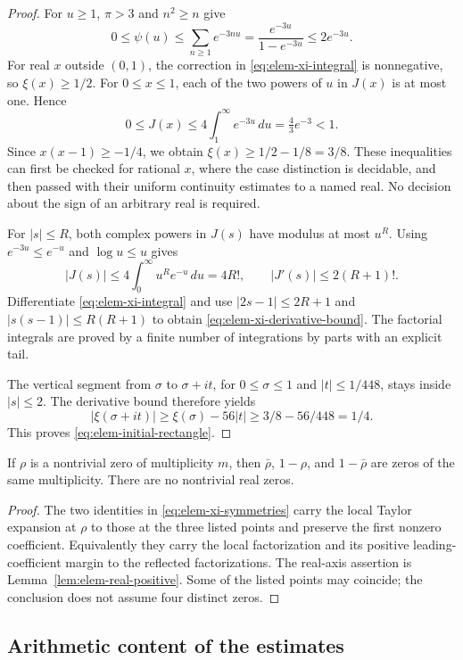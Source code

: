 \begin{proof}
For $u\ge1$, $\pi>3$ and $n^2\ge n$ give
\[
 0\le\psi(u)\le\sum_{n\ge1}e^{-3nu}
 =\frac{e^{-3u}}{1-e^{-3u}}\le2e^{-3u}.
\]
For real $x$ outside $(0,1)$, the correction in
\eqref{eq:elem-xi-integral} is nonnegative, so $\xi(x)\ge1/2$.
For $0\le x\le1$, each of the two powers of $u$ in $J(x)$ is at
most one.  Hence
\[
 0\le J(x)\le4\int_1^\infty e^{-3u}\,du
 =\tfrac43e^{-3}<1.
\]
Since $x(x-1)\ge-1/4$, we obtain $\xi(x)\ge1/2-1/8=3/8$.
These inequalities can first be checked for rational $x$, where the
case distinction is decidable, and then passed with their uniform
continuity estimates to a named real.  No decision about the sign of
an arbitrary real is required.

For $|s|\le R$, both complex powers in $J(s)$ have modulus at most
$u^R$.  Using $e^{-3u}\le e^{-u}$ and $\log u\le u$ gives
\[
 |J(s)|\le4\int_0^\infty u^Re^{-u}\,du=4R!,
 \qquad |J'(s)|\le2(R+1)!.
\]
Differentiate \eqref{eq:elem-xi-integral} and use
$|2s-1|\le2R+1$ and $|s(s-1)|\le R(R+1)$ to obtain
\eqref{eq:elem-xi-derivative-bound}.  The factorial integrals are
proved by a finite number of integrations by parts with an explicit
tail.

The vertical segment from $\sigma$ to $\sigma+it$, for
$0\le\sigma\le1$ and $|t|\le1/448$, stays inside $|s|\le2$.
The derivative bound therefore yields
\[
 |\xi(\sigma+it)|\ge\xi(\sigma)-56|t|
 \ge3/8-56/448=1/4.
\]
This proves \eqref{eq:elem-initial-rectangle}.
\end{proof}

\begin{corollary}
\label{cor:elem-symmetry}
If $\rho$ is a nontrivial zero of multiplicity $m$, then
$\bar\rho$, $1-\rho$, and $1-\bar\rho$ are zeros of the same
multiplicity.  There are no nontrivial real zeros.
\end{corollary}

\begin{proof}
The two identities in \eqref{eq:elem-xi-symmetries} carry the local
Taylor expansion at $\rho$ to those at the three listed points and
preserve the first nonzero coefficient.  Equivalently they carry the
local factorization and its positive leading-coefficient margin to the
reflected factorizations.  The real-axis assertion is
Lemma~\ref{lem:elem-real-positive}.  Some of the listed points may
coincide; the conclusion does not assume four distinct zeros.
\end{proof}

\subsection{Arithmetic content of the estimates}

